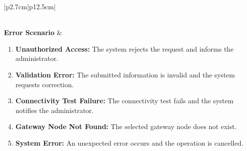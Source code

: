 \begin{table}[H]
\begin{tabular}{|p{2.7cm}|p{12.5cm}|}
\begin{minipage}[t]{\linewidth}
                                  \end{minipage} \\ \hline
        \textbf{Error Scenario} & \begin{minipage}[t]{\linewidth}
                                      \begin{enumerate}[topsep=0pt,itemsep=1pt,parsep=0pt,partopsep=0pt]
                                          \item \textbf{Unauthorized Access:} The system rejects the request and informs the administrator.
                                          \item \textbf{Validation Error:} The submitted information is invalid and the system requests correction.
                                          \item \textbf{Connectivity Test Failure:} The connectivity test fails and the system notifies the administrator.
                                          \item \textbf{Gateway Node Not Found:} The selected gateway node does not exist.
                                          \item \textbf{System Error:} An unexpected error occurs and the operation is cancelled.
                                      \end{enumerate}
                                  \end{minipage} \\ \hline
    \end{tabular}
    \label{tab:admin-verify-unverify-gateway}
\end{table}


